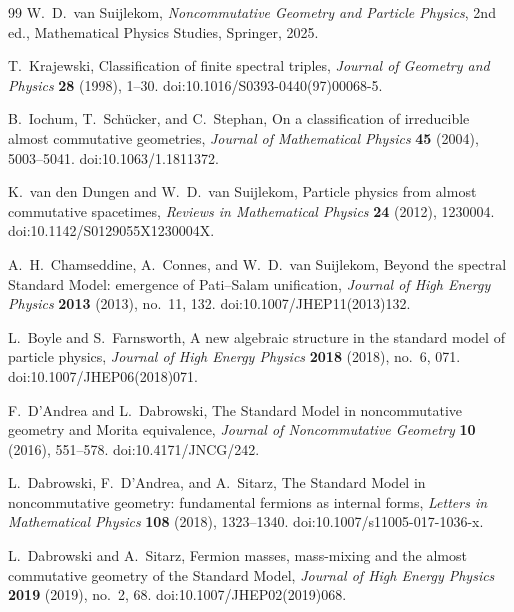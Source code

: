 \documentclass[11pt]{article}
\theoremstyle{definition}
\theoremstyle{remark}
\begin{document}
\begin{thebibliography}{99}
W.~D.~van Suijlekom,
\newblock \emph{Noncommutative Geometry and Particle Physics},
\newblock 2nd ed., Mathematical Physics Studies, Springer, 2025.


T.~Krajewski,
\newblock Classification of finite spectral triples,
\newblock \emph{Journal of Geometry and Physics} \textbf{28} (1998), 1--30.
\newblock doi:10.1016/S0393-0440(97)00068-5.

B.~Iochum, T.~Sch\"ucker, and C.~Stephan,
\newblock On a classification of irreducible almost commutative geometries,
\newblock \emph{Journal of Mathematical Physics} \textbf{45} (2004),
5003--5041.
\newblock doi:10.1063/1.1811372.

K.~van den Dungen and W.~D.~van Suijlekom,
\newblock Particle physics from almost commutative spacetimes,
\newblock \emph{Reviews in Mathematical Physics} \textbf{24} (2012),
1230004.
\newblock doi:10.1142/S0129055X1230004X.

A.~H.~Chamseddine, A.~Connes, and W.~D.~van Suijlekom,
\newblock Beyond the spectral Standard Model: emergence of Pati--Salam
unification,
\newblock \emph{Journal of High Energy Physics} \textbf{2013} (2013),
no.~11, 132.
\newblock doi:10.1007/JHEP11(2013)132.

L.~Boyle and S.~Farnsworth,
\newblock A new algebraic structure in the standard model of particle physics,
\newblock \emph{Journal of High Energy Physics} \textbf{2018} (2018), no.~6, 071.
\newblock doi:10.1007/JHEP06(2018)071.

F.~D'Andrea and L.~Dabrowski,
\newblock The Standard Model in noncommutative geometry and Morita equivalence,
\newblock \emph{Journal of Noncommutative Geometry} \textbf{10} (2016),
551--578.
\newblock doi:10.4171/JNCG/242.

L.~Dabrowski, F.~D'Andrea, and A.~Sitarz,
\newblock The Standard Model in noncommutative geometry: fundamental fermions
as internal forms,
\newblock \emph{Letters in Mathematical Physics} \textbf{108} (2018),
1323--1340.
\newblock doi:10.1007/s11005-017-1036-x.

L.~Dabrowski and A.~Sitarz,
\newblock Fermion masses, mass-mixing and the almost commutative geometry of
the Standard Model,
\newblock \emph{Journal of High Energy Physics} \textbf{2019} (2019),
no.~2, 68.
\newblock doi:10.1007/JHEP02(2019)068.


\end{thebibliography}
\end{document}
